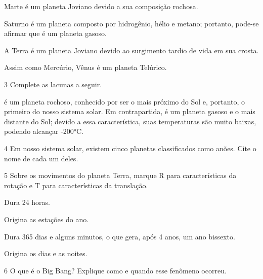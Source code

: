\begin{boxlist}
\item Marte é um planeta Joviano devido a sua composição rochosa. 

\item Saturno é um planeta composto por hidrogênio, hélio e metano;
portanto, pode-se afirmar que é um planeta gasoso. 

\item A Terra é um planeta Joviano devido ao surgimento tardio de vida em
sua crosta. 

\item Assim como Mercúrio, Vênus é um planeta Telúrico. 
\end{boxlist}

\num{3}  Complete as lacunas a seguir.

\preencher é um planeta rochoso, conhecido por ser
o mais próximo do Sol e, portanto, o primeiro do nosso sistema solar. Em
contrapartida, \preencher é um planeta gasoso e o mais distante
do Sol; devido a essa característica, suas temperaturas são muito
baixas, podendo alcançar -200°C. 

\num{4}  Em nosso sistema solar, existem cinco planetas classificados como anões. Cite o nome de cada um deles.



\num{5}  Sobre os movimentos do planeta Terra, marque R para características da rotação e T para características da translação.

\begin{boxlist}
\item Dura 24 horas. 

\item Origina as estações do ano. 

\item Dura 365 dias e alguns minutos, o que gera, após 4 anos, um ano
bissexto. 

\item Origina os dias e as noites. 
\end{boxlist}

\num{6}  O que é o Big Bang? Explique como e quando esse fenômeno ocorreu.

